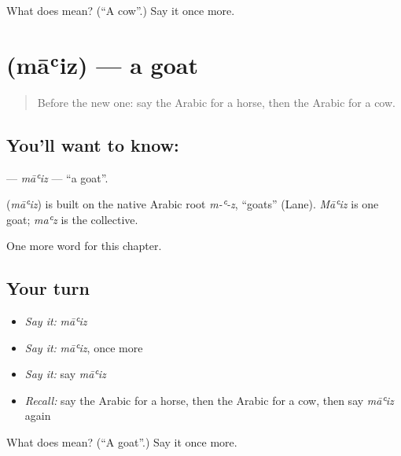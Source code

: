 \begin{tcolorbox}[breakable,colback=teal!4,colframe=teal!35!black,title={Before you move on}]
What does  mean? (\textquotedblleft{}A cow\textquotedblright{}.) Say it once more.
\end{tcolorbox}
\section[\texorpdfstring{\ar{ماعز} (māʿiz)}{ماعز (māʿiz)}]{ (māʿiz) — a goat}

\label{lesson:AR-C79-maiz}



\begin{quote}
Before the new one: say the Arabic for a horse, then the Arabic for a cow.
\end{quote}

\subsection*{You'll want to know: }
\textbf{} — \emph{māʿiz} — \textquotedblleft{}a goat\textquotedblright{}.

\begin{cousinweb}
\textbf{} (\emph{māʿiz}) is built on the native Arabic root \emph{m-ʿ-z}, \textquotedblleft{}goats\textquotedblright{} (Lane). \emph{Māʿiz} is one goat; \emph{maʿz} is the collective.
\end{cousinweb}

\begin{grammarlens}[title={What you've built}]
One more word for this chapter.
\end{grammarlens}

\subsection*{Your turn}
\begin{itemize}
\raggedright
  \item \emph{Say it:} \emph{māʿiz}
  \item \emph{Say it:} \emph{māʿiz}, once more
  \item \emph{Say it:} say \emph{māʿiz}
  \item \emph{Recall:} say the Arabic for a horse, then the Arabic for a cow, then say \emph{māʿiz} again
\end{itemize}

\begin{tcolorbox}[breakable,colback=teal!4,colframe=teal!35!black,title={Before you move on}]
What does  mean? (\textquotedblleft{}A goat\textquotedblright{}.) Say it once more.
\end{tcolorbox}
